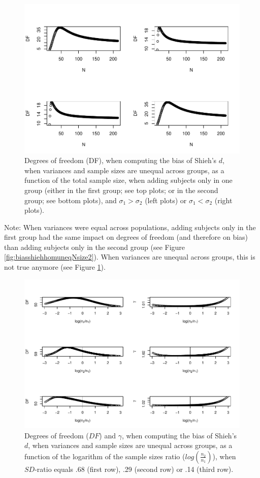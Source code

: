 \documentclass[
  english,
  man,mask]{apa6}
\begin{document}
\begin{figure}
\centering
\includegraphics{SupMat1_files/figure-latex/biasshiehhetuneqNsize2-1.pdf}
\caption{\label{fig:biasshiehhetuneqNsize2}Degrees of freedom (DF), when computing the bias of Shieh's \(d\), when variances and sample sizes are unequal across groups, as a function of the total sample size, when adding subjects only in one group (either in the first group; see top plots; or in the second group; see bottom plots), and \(\sigma_1 > \sigma_2\) (left plots) or \(\sigma_1 < \sigma_2\) (right plots).}
\end{figure}

Note: When variances were equal across populations, adding subjects only in the first group had the same impact on degrees of freedom (and therefore on bias) than adding subjects only in the second group (see Figure \ref{fig:biasshiehhomuneqNsize2}). When variances are unequal across groups, this is not true anymore (see Figure \ref{fig:biasshiehhetuneqNsize2}).

\begin{figure}
\centering
\includegraphics{SupMat1_files/figure-latex/biasshiehhetunbaldfandvar-1.pdf}
\caption{\label{fig:biasshiehhetunbaldfandvar}Degrees of freedom (\(DF\)) and \(\gamma\), when computing the bias of Shieh's \(d\), when variances and sample sizes are unequal across groups, as a function of the logarithm of the sample sizes ratio (\(log \left( \frac{n_2}{n_1} \right)\)), when \(SD\)-ratio equals .68 (first row), .29 (second row) or .14 (third row).}
\end{figure}
\end{document}
